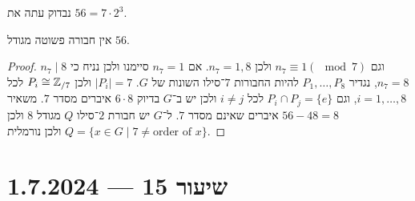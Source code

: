 נבדוק עתה את $56 = 7 \cdot 2^3$.
\begin{proposition}
	אין חבורה פשוטה מגודל $56$.
\end{proposition}
\begin{proof}
	$n_7 \mid 8$ וגם $n_7 \equiv 1 (\mod 7)$ ולכן $n_7 = 1, 8$. אם $n_7 = 1$ סיימנו ולכן נניח כי $n_7 = 8$, נגדיר $P_1, \dots, P_8$ להיות החבורות $7$־סילו השונות של $G$.
	$|P_i| = 7$ ולכן $P_i \cong \mathbb{Z}_{/7}$ לכל $i = 1, \dots, 8$, וגם $P_i \cap P_j = \{ e \}$ לכל $i \ne j$ ולכן יש ב־$G$ בדיוק $6 \cdot 8$ איברים מסדר $7$.
	משאיר $56 - 48 = 8$ איברים שאינם מסדר $7$.
	ל־$G$ יש חבורת $2$־סילו $Q$ מגודל $8$ ולכן $Q = \{ x \in G \mid 7 \ne \text{order of }x \}$ ולכן נורמלית.
\end{proof}

\section{שיעור 15 --- 1.7.2024}
